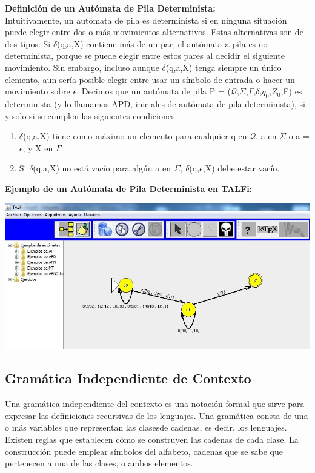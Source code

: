 \documentclass[12pt,a4paper,spanish]{book}
\begin{document}
\begin{itemize}
{\bf Definici\'on de un Aut\'omata de Pila Determinista:\\}
\newline
Intuitivamente, un aut\'omata de pila es determinista si en ninguna situaci\'on
puede elegir entre dos o m\'as movimientos alternativos. Estas alternativas son
de dos tipos. Si $\delta$(q,a,X) contiene m\'as de un par, el aut\'omata a pila es
no determinista, porque se puede elegir entre estos pares al decidir el siguiente
movimiento. Sin embargo, incluso aunque $\delta$(q,a,X) tenga siempre un
\'unico elemento, aun ser\'ia posible elegir entre usar un s\'imbolo de entrada o
hacer un movimiento sobre $\epsilon$. Decimos que un aut\'omata de pila P =
($\mathcal{Q}$,$\Sigma$,$\Gamma$,$\delta$,$q_{0}$,$Z_{0}$,F) es determinista (y lo llamamos
APD, iniciales de aut\'omata de pila determinista), si y solo si se cumplen las
siguientes condiciones:
\begin{enumerate}
\item $\delta$(q,a,X) tiene como m\'aximo un elemento para cualquier q en $\mathcal{Q}$, a en
$\Sigma$ o a = $\epsilon$, y X en $\Gamma$.
\item Si $\delta$(q,a,X) no est\'a vac\'io para alg\'un a en $\Sigma$,
$\delta$(q,$\epsilon$,X) debe estar vac\'io.
\end{enumerate}
\newpage
{\bf Ejemplo de un Aut\'omata de Pila Determinista en TALFi:}
\begin{center}
\includegraphics[width=\textwidth]{apd.jpg}
\end{center}
\end{itemize}

\subsection{Gram\'atica Independiente de Contexto}
Una gram\'atica independiente del contexto es una notaci\'on formal que sirve para expresar las definiciones recursivas de los lenguajes. Una gram\'atica consta de una o m\'as variables que representan las clasesde cadenas, es decir, los lenguajes. Existen reglas que establecen c\'omo se construyen las cadenas de cada clase. La construcci\'on puede emplear s\'imbolos del alfabeto, cadenas que se sabe que pertenecen a una de las clases, o ambos elementos.
\end{document}

